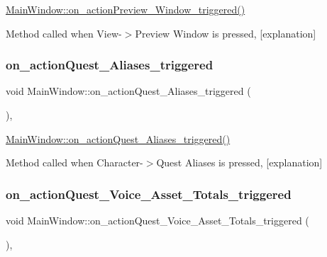 \hyperlink{class_main_window_ad39efdb57cad0ee03b2491037fa6b5c0}{Main\+Window\+::on\+\_\+action\+Preview\+\_\+\+Window\+\_\+triggered()} 

Method called when View-\/$>$Preview Window is pressed, \mbox{[}explanation\mbox{]} \mbox{\label{class_main_window_a4f3cdc71383485c5d1f2b5db0f0e6bc2}} 
\subsubsection{\texorpdfstring{on\+\_\+action\+Quest\+\_\+\+Aliases\+\_\+triggered}{on\_actionQuest\_Aliases\_triggered}}
{\footnotesize\ttfamily void Main\+Window\+::on\+\_\+action\+Quest\+\_\+\+Aliases\+\_\+triggered (\begin{DoxyParamCaption}{ }\end{DoxyParamCaption})\hspace{0.3cm}{\ttfamily [private]}, {\ttfamily [slot]}}



\hyperlink{class_main_window_a4f3cdc71383485c5d1f2b5db0f0e6bc2}{Main\+Window\+::on\+\_\+action\+Quest\+\_\+\+Aliases\+\_\+triggered()} 

Method called when Character-\/$>$Quest Aliases is pressed, \mbox{[}explanation\mbox{]} \mbox{\label{class_main_window_a008331d7419ef18e54e25172b94e05c0}} 
\subsubsection{\texorpdfstring{on\+\_\+action\+Quest\+\_\+\+Voice\+\_\+\+Asset\+\_\+\+Totals\+\_\+triggered}{on\_actionQuest\_Voice\_Asset\_Totals\_triggered}}
{\footnotesize\ttfamily void Main\+Window\+::on\+\_\+action\+Quest\+\_\+\+Voice\+\_\+\+Asset\+\_\+\+Totals\+\_\+triggered (\begin{DoxyParamCaption}{ }\end{DoxyParamCaption})\hspace{0.3cm}{\ttfamily [private]}, {\ttfamily [slot]}}



